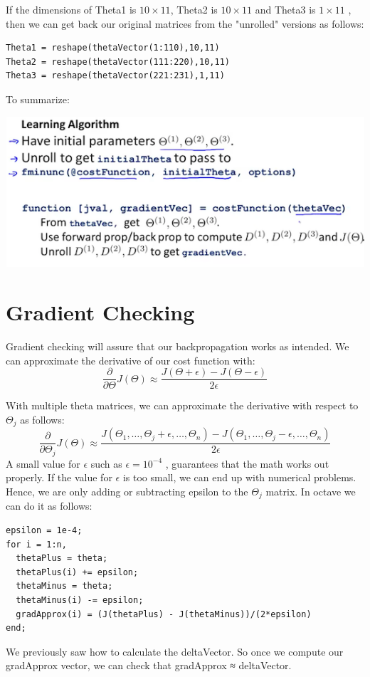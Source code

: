 \documentclass[10pt,a4paper,UTF8]{article}
\begin{document}
If the dimensions of Theta1 is \(10\times 11\), Theta2 is \(10\times 11\)  and Theta3 is \(1\times 11\) , then we can get back our original matrices from the "unrolled" versions as follows:
\lstset{language=matlab,label= ,caption= ,captionpos=b,numbers=none}
\begin{lstlisting}
Theta1 = reshape(thetaVector(1:110),10,11)
Theta2 = reshape(thetaVector(111:220),10,11)
Theta3 = reshape(thetaVector(221:231),1,11)
\end{lstlisting}

To summarize:

\begin{center}
\includegraphics[width=.9\linewidth]{../../img/computer_ng/20171014unroll.png}
\end{center}
\section{Gradient Checking}
\label{sec:org0ca1d8b}


Gradient checking will assure that our backpropagation works as intended. We can approximate the derivative of our cost function with:
\begin{equation}
\label{eq:7}
\dfrac{\partial}{\partial\Theta}J(\Theta) \approx \dfrac{J(\Theta + \epsilon) - J(\Theta - \epsilon)}{2\epsilon}
\end{equation}

With multiple theta matrices, we can approximate the derivative with respect to \(\Theta_{j}\) as follows:
\begin{equation}
\label{eq:8}
\dfrac{\partial}{\partial\Theta_j}J(\Theta) \approx \dfrac{J(\Theta_1, \dots, \Theta_j + \epsilon, \dots, \Theta_n) - J(\Theta_1, \dots, \Theta_j - \epsilon, \dots, \Theta_n)}{2\epsilon}
\end{equation}
A small value for \(\epsilon\)  such as \(\epsilon=10^{-4}\) , guarantees that the math works out properly. If the value for \(\epsilon\) is too small, we can end up with numerical problems.
Hence, we are only adding or subtracting epsilon to the \(\Theta_{j}\) matrix. In octave we can do it as follows:
\lstset{language=matlab,label= ,caption= ,captionpos=b,numbers=none}
\begin{lstlisting}
epsilon = 1e-4;
for i = 1:n,
  thetaPlus = theta;
  thetaPlus(i) += epsilon;
  thetaMinus = theta;
  thetaMinus(i) -= epsilon;
  gradApprox(i) = (J(thetaPlus) - J(thetaMinus))/(2*epsilon)
end;
\end{lstlisting}
We previously saw how to calculate the deltaVector. So once we compute our gradApprox vector, we can check that gradApprox ≈ deltaVector.
\end{document}
